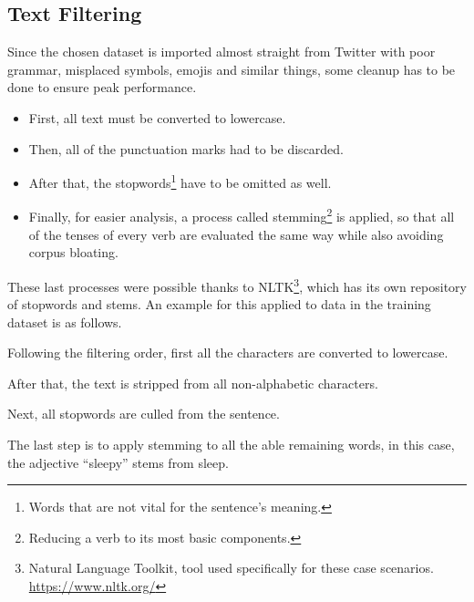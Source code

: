 \subsection{Text Filtering}
Since the chosen dataset is imported almost straight from Twitter with poor grammar, misplaced symbols, emojis and similar things, some cleanup has to be done to ensure peak performance.
\begin{itemize}
\item First, all text must be converted to lowercase.
\item Then, all of the punctuation marks had to be discarded.
\item After that, the stopwords\footnote{Words that are not vital for the sentence's meaning.} have to be omitted as well.
\item Finally, for easier analysis, a process called stemming\footnote{Reducing a verb to its most basic components.} is applied, so that all of the tenses of every verb are evaluated the same way while also avoiding corpus bloating.
\end{itemize} 
These last processes were possible thanks to NLTK\footnote{Natural Language Toolkit, tool used specifically for these case scenarios. \url{https://www.nltk.org/}}, which has its own repository of stopwords and stems.
An example for this applied to data in the training dataset is as follows.
\begin{center}
\end{center}
Following the filtering order, first all the characters are converted to lowercase.
\begin{center}
\end{center}
After that, the text is stripped from all non-alphabetic characters.
\begin{center}
\end{center}
Next, all stopwords are culled from the sentence.
\begin{center}
\end{center}
The last step is to apply stemming to all the able remaining words, in this case, the adjective ``sleepy'' stems from sleep.
\begin{center}
\end{center}


